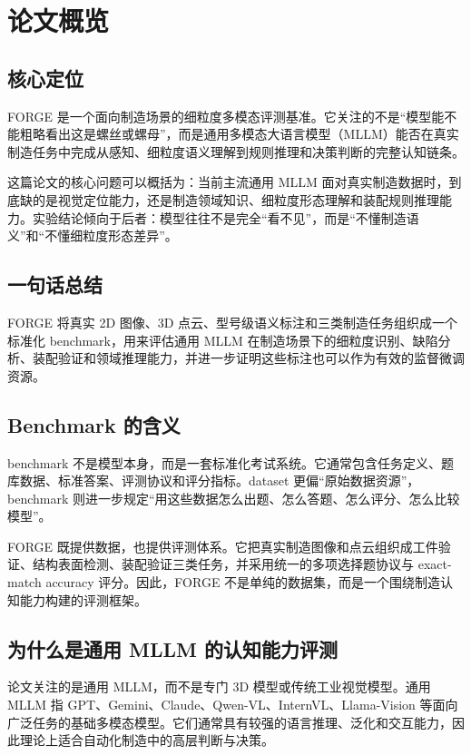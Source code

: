 \section{论文概览}

\subsection{核心定位}

FORGE 是一个面向制造场景的细粒度多模态评测基准。它关注的不是“模型能不能粗略看出这是螺丝或螺母”，而是通用多模态大语言模型（MLLM）能否在真实制造任务中完成从感知、细粒度语义理解到规则推理和决策判断的完整认知链条。

这篇论文的核心问题可以概括为：当前主流通用 MLLM 面对真实制造数据时，到底缺的是视觉定位能力，还是制造领域知识、细粒度形态理解和装配规则推理能力。实验结论倾向于后者：模型往往不是完全“看不见”，而是“不懂制造语义”和“不懂细粒度形态差异”。

\subsection{一句话总结}

FORGE 将真实 2D 图像、3D 点云、型号级语义标注和三类制造任务组织成一个标准化 benchmark，用来评估通用 MLLM 在制造场景下的细粒度识别、缺陷分析、装配验证和领域推理能力，并进一步证明这些标注也可以作为有效的监督微调资源。

\subsection{Benchmark 的含义}

benchmark 不是模型本身，而是一套标准化考试系统。它通常包含任务定义、题库数据、标准答案、评测协议和评分指标。dataset 更偏“原始数据资源”，benchmark 则进一步规定“用这些数据怎么出题、怎么答题、怎么评分、怎么比较模型”。

FORGE 既提供数据，也提供评测体系。它把真实制造图像和点云组织成工件验证、结构表面检测、装配验证三类任务，并采用统一的多项选择题协议与 exact-match accuracy 评分。因此，FORGE 不是单纯的数据集，而是一个围绕制造认知能力构建的评测框架。

\subsection{为什么是通用 MLLM 的认知能力评测}

论文关注的是通用 MLLM，而不是专门 3D 模型或传统工业视觉模型。通用 MLLM 指 GPT、Gemini、Claude、Qwen-VL、InternVL、Llama-Vision 等面向广泛任务的基础多模态模型。它们通常具有较强的语言推理、泛化和交互能力，因此理论上适合自动化制造中的高层判断与决策。

